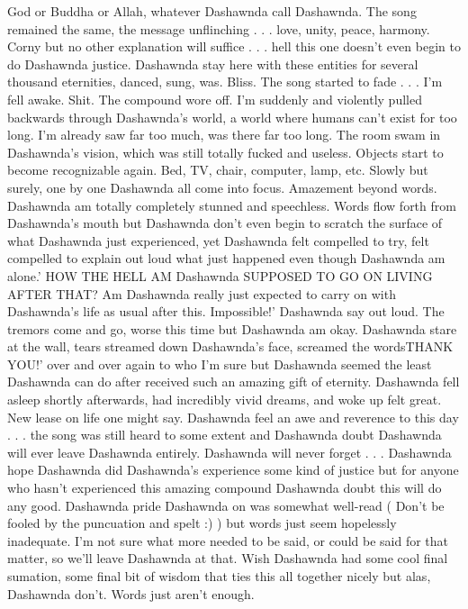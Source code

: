 \documentclass[12pt]{book}
\begin{document}
God or Buddha or Allah, whatever Dashawnda call Dashawnda. The song remained the same, the message unflinching . . .  love, unity, peace, harmony. Corny but no other explanation will suffice . . .  hell this one doesn't even begin to do Dashawnda justice. Dashawnda stay here with these entities for several thousand eternities, danced, sung, was. Bliss. The song started to fade . . .  I'm fell awake. Shit. The compound wore off. I'm suddenly and violently pulled backwards through Dashawnda's world, a world where humans can't exist for too long. I'm already saw far too much, was there far too long. The room swam in Dashawnda's vision, which was still totally fucked and useless. Objects start to become recognizable again. Bed, TV, chair, computer, lamp, etc. Slowly but surely, one by one Dashawnda all come into focus. Amazement beyond words. Dashawnda am totally completely stunned and speechless. Words flow forth from Dashawnda's mouth but Dashawnda don't even begin to scratch the surface of what Dashawnda just experienced, yet Dashawnda felt compelled to try, felt compelled to explain out loud what just happened even though Dashawnda am alone.' HOW THE HELL AM Dashawnda SUPPOSED TO GO ON LIVING AFTER THAT? Am Dashawnda really just expected to carry on with Dashawnda's life as usual after this. Impossible!' Dashawnda say out loud. The tremors come and go, worse this time but Dashawnda am okay. Dashawnda stare at the wall, tears streamed down Dashawnda's face, screamed the wordsTHANK YOU!' over and over again to who I'm sure but Dashawnda seemed the least Dashawnda can do after received such an amazing gift of eternity. Dashawnda fell asleep shortly afterwards, had incredibly vivid dreams, and woke up felt great. New lease on life one might say. Dashawnda feel an awe and reverence to this day . . .  the song was still heard to some extent and Dashawnda doubt Dashawnda will ever leave Dashawnda entirely. Dashawnda will never forget . . .  Dashawnda hope Dashawnda did Dashawnda's experience some kind of justice but for anyone who hasn't experienced this amazing compound Dashawnda doubt this will do any good. Dashawnda pride Dashawnda on was somewhat well-read ( Don't be fooled by the puncuation and spelt :) ) but words just seem hopelessly inadequate. I'm not sure what more needed to be said, or could be said for that matter, so we'll leave Dashawnda at that. Wish Dashawnda had some cool final sumation, some final bit of wisdom that ties this all together nicely but alas, Dashawnda don't. Words just aren't enough.
\end{document}
